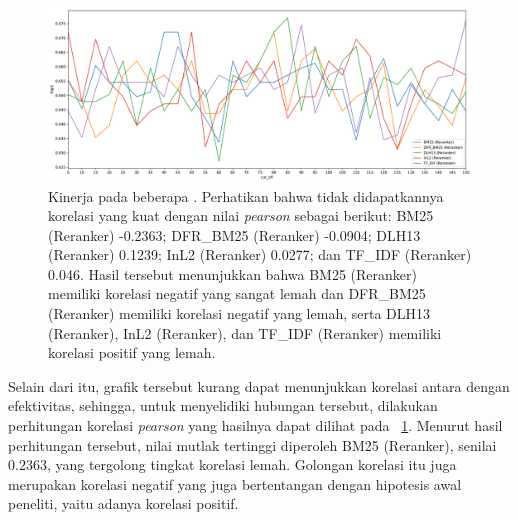 \begin{landscape}
    \begin{figure}
        \centering
        \includegraphics[scale=0.6]{assets/pdfs/Cut Off Experiment Results_3.pdf}
        \caption{Kinerja pada beberapa \cutoff{}. Perhatikan bahwa tidak didapatkannya korelasi yang kuat dengan nilai \textit{pearson} sebagai berikut: BM25 (Reranker) -0.2363; DFR\_BM25 (Reranker) -0.0904; DLH13 (Reranker) 0.1239; InL2 (Reranker) 0.0277; dan TF\_IDF (Reranker) 0.046. Hasil tersebut menunjukkan bahwa BM25 (Reranker) memiliki korelasi negatif yang sangat lemah dan DFR\_BM25 (Reranker) memiliki korelasi negatif yang lemah, serta DLH13 (Reranker), InL2 (Reranker), dan TF\_IDF (Reranker) memiliki korelasi positif yang lemah.}
        \label{grafik:cutoff}
    \end{figure}
\end{landscape}

Selain dari itu, grafik tersebut kurang dapat menunjukkan korelasi antara \cutoff{} dengan efektivitas, sehingga, untuk menyelidiki hubungan tersebut, dilakukan perhitungan korelasi \textit{pearson} yang hasilnya dapat dilihat pada \gambar{}~\ref{grafik:cutoff}. Menurut hasil perhitungan tersebut, nilai mutlak tertinggi diperoleh BM25 (Reranker), senilai $0.2363$, yang tergolong tingkat korelasi lemah. Golongan korelasi itu juga merupakan korelasi negatif yang juga bertentangan dengan hipotesis awal peneliti, yaitu adanya korelasi positif.

